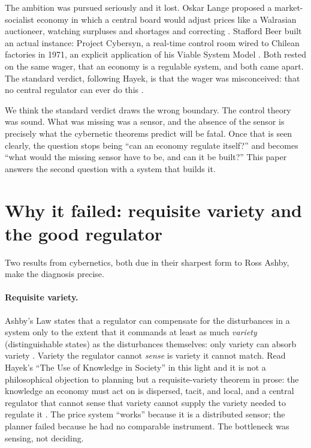\documentclass[10pt]{article}
\begin{document}
The ambition was pursued seriously and it lost. Oskar Lange proposed a market-socialist economy in which
a central board would adjust prices like a Walrasian auctioneer, watching surpluses and shortages and
correcting \cite{lange1936}. Stafford Beer built an actual instance: Project Cybersyn, a real-time
control room wired to Chilean factories in 1971, an explicit application of his Viable System Model
\cite{beer1972,medina2011}. Both rested on the same wager, that an economy is a regulable system, and
both came apart. The standard verdict, following Hayek, is that the wager was misconceived: that no
central regulator can ever do this \cite{hayek1945}.

We think the standard verdict draws the wrong boundary. The control theory was sound. What was missing
was a sensor, and the absence of the sensor is precisely what the cybernetic theorems predict will be
fatal. Once that is seen clearly, the question stops being ``can an economy regulate itself?'' and
becomes ``what would the missing sensor have to be, and can it be built?'' This paper answers the second
question with a system that builds it.

\section{Why it failed: requisite variety and the good regulator}

Two results from cybernetics, both due in their sharpest form to Ross Ashby, make the diagnosis precise.

\paragraph{Requisite variety.} Ashby's Law states that a regulator can compensate for the disturbances
in a system only to the extent that it commands at least as much \emph{variety} (distinguishable states)
as the disturbances themselves: only variety can absorb variety \cite{ashby1956}. Variety the regulator
cannot \emph{sense} is variety it cannot match. Read Hayek's ``The Use of Knowledge in Society'' in this
light and it is not a philosophical objection to planning but a requisite-variety theorem in prose: the
knowledge an economy must act on is dispersed, tacit, and local, and a central regulator that cannot
sense that variety cannot supply the variety needed to regulate it \cite{hayek1945}. The price system
``works'' because it is a distributed sensor; the planner failed because he had no comparable instrument.
The bottleneck was sensing, not deciding.
\end{document}
